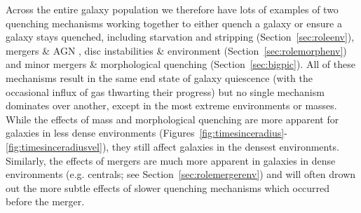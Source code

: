 \documentclass[useAMS,usenatbib]{mn2e}
\begin{document}
Across the entire galaxy population we therefore have lots of examples of two quenching mechanisms working together to either quench a galaxy or ensure a galaxy stays quenched, including starvation and stripping (Section~\ref{sec:roleenv}), mergers \& AGN \citep{smethurst16}, disc instabilities \&  environment (Section~\ref{sec:rolemorphenv}) and minor mergers \& morphological quenching (Section~\ref{sec:bigpic}). All of these mechanisms result in the same end state of galaxy quiescence (with the occasional influx of gas thwarting their progress) but no single mechanism dominates over another, except in the most extreme environments or masses. While the effects of mass and morphological quenching are more apparent for galaxies in less dense environments (Figures~\ref{fig:timesinceradius}-\ref{fig:timesinceradiusvel}), they still affect galaxies in the densest environments. Similarly, the effects of mergers are much more apparent in galaxies in dense environments (e.g. centrals; see Section~\ref{sec:rolemergerenv}) and will often drown out the more subtle effects of slower quenching mechanisms which occurred before the merger. %

\end{document}
